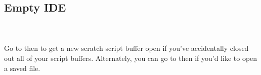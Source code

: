 


\subsection{Empty IDE}

\begin{minipage}{\linewidth}
        
        \label{fig: IDEempty} 
\end{minipage}

~\\~\\ 
Go to  then  to get a new scratch script buffer open if you've accidentally closed out all of your script buffers. Alternately, you can go to  then  if you'd like to open a saved file. 





